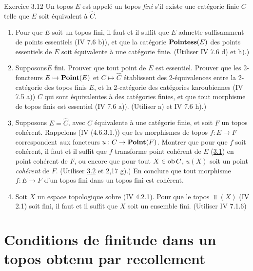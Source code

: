 \documentclass[10pt]{../fichiers-configuration-latex/smfart}
\begin{document}
\begin{enonce*}[remark]{Exercice 3.12}
Un topos $E$ est appelé un topos \emph{fini} s'il existe une catégorie
finie $C$ telle que $E$ soit équivalent à $\widehat{C}$.
\begin{enumerate}
\renewcommand{\theenumi}{\alph{enumi}}
\renewcommand{\labelenumi}{\theenumi)}
\item Pour que $E$ soit un topos fini, il faut et il suffit que $E$
  admette suffisamment de points essentiels (IV 7.6 b)), et que la
  catégorie $\operatorname{\mathbf{Pointess}}(E)$ des points essentiels de $E$ soit
  équivalente à une catégorie finie. (Utiliser IV 7.6 d) et h).)

\item Supposons\pageoriginale $E$ fini. Prouver que tout point de $E$ est
  essentiel. Prouver que les 2-foncteurs $E \mapsto \operatorname{\mathbf{Point}}(E)$ et $C
  \mapsto \widehat{C}$ établissent des 2-équivalences entre la 2-catégorie
  des topos finis $E$, et la 2-catégorie des catégories karoubiennes
  (IV 7.5 a)) $C$ qui sont équivalentes à des catégories finies, et
  que tout morphisme de topos finis est essentiel (IV 7.6
  a)). (Utiliser a) et IV 7.6 h).)

\item Supposons $E = \widehat{C}$, avec $C$ équivalente à une
  catégorie finie, et soit $F$ un topos cohérent. Rappelons (IV
  (4.6.3.1.)) que les morphismes de topos $f : E \to F$ correspondent
  aux foncteurs $u : C \to \Ppoint(F)$. Montrer que pour que $f$ soit
  cohérent, il faut et il suffit que $f$ transforme point cohérent de
  $E$ (\hyperref[VI.def3.1]{3.1}) en point cohérent de $F$, ou encore que pour tout $X \in
  \operatorname{ob} C$, $u(X)$ soit un point \emph{cohérent} de $F$. (Utiliser \hyperref[VI.prop3.2]{3.2} et
  2,17 g).) En conclure que tout morphisme $f : E \to F$ d'un topos
  fini dans un topos fini est cohérent.

\item Soit $X$ un espace topologique sobre (IV 4.2.1). Pour que le
  topos $\Top(X)$ (IV 2.1) soit fini, il faut et il suffit que $X$
  soit un ensemble fini. (Utiliser IV 7.1.6)
\end{enumerate}
\end{enonce*}

\section{Conditions de finitude dans un topos obtenu par
  recollement}
\end{document}
